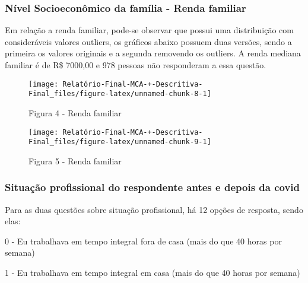 \documentclass[
]{article}
\begin{document}
\hypertarget{nuxedvel-socioeconuxf4mico-da-famuxedlia---renda-familiar}{%
\subsubsection{\texorpdfstring{\textbf{Nível Socioeconômico da família -
Renda
familiar}}{Nível Socioeconômico da família - Renda familiar}}\label{nuxedvel-socioeconuxf4mico-da-famuxedlia---renda-familiar}}

Em relação a renda familiar, pode-se observar que possui uma
distribuição com consideráveis valores outliers, os gráficos abaixo
possuem duas versões, sendo a primeira os valores originais e a segunda
removendo os outliers. A renda mediana familiar é de R\$ 7000,00 e 978
pessoas não responderam a essa questão.

\begin{figure}

{\centering \texttt{[image: Relatório-Final-MCA-+-Descritiva-Final\_files/figure-latex/unnamed-chunk-8-1]} 

}

\caption{Figura 4 - Renda familiar}\label{fig:unnamed-chunk-8}
\end{figure}

\begin{figure}

{\centering \texttt{[image: Relatório-Final-MCA-+-Descritiva-Final\_files/figure-latex/unnamed-chunk-9-1]} 

}

\caption{Figura 5 - Renda familiar}\label{fig:unnamed-chunk-9}
\end{figure}

\hypertarget{situauxe7uxe3o-profissional-do-respondente-antes-e-depois-da-covid}{%
\subsubsection{\texorpdfstring{\textbf{Situação profissional do
respondente antes e depois da
covid}}{Situação profissional do respondente antes e depois da covid}}\label{situauxe7uxe3o-profissional-do-respondente-antes-e-depois-da-covid}}

Para as duas questões sobre situação profissional, há 12 opções de
resposta, sendo elas:

0 - Eu trabalhava em tempo integral fora de casa (mais do que 40 horas
por semana)

1 - Eu trabalhava em tempo integral em casa (mais do que 40 horas por
semana)
\end{document}
